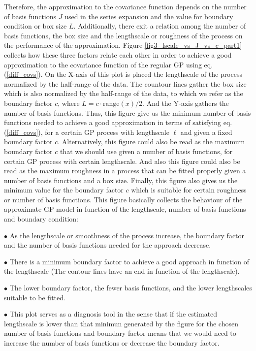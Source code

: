 \documentclass[]{interact}
\theoremstyle{plain}%
\theoremstyle{definition}
\theoremstyle{remark}
\begin{document}
Therefore, the approximation to the covariance function depends on the number of basis functions $J$ used in the series expansion and the value for boundary condition or box size $L$. Additionally, there exit a relation among the number of basis functions, the box size and the lengthscale or roughness of the process on the performance of the approximation. Figure \ref{fig3_lscale_vs_J_vs_c_part1} collects how these three factors relate each other in order to achieve a good approximation to the covariance function of the regular GP using eq. (\ref{diff_covs}). On the X-axis of this plot is placed the lengthscale of the process normalized by the half-range of the data. The countour lines gather the box size which is also normalized by the half-range of the data, to which we refer as the boundary factor $c$, where $L=c \cdot \text{range}(x)/2$. And the Y-axis gathers the number of basis functions. Thus, this figure give us the minimum number of basis functions needed to achieve a good approximation in terms of satisfying eq. (\ref{diff_covs}), for a certain GP process with lengthscale $\ell$ and given a fixed boundary factor $c$. Alternatively, this figure could also be read as the maximum boundary factor $c$ that we should use given a number of basis functions, for certain GP process with certain lengthscale. And also this figure could also be read as the maximum roughness in a process that can be fitted properly given a number of basis functions and a box size. Finally, this figure also gives us the minimum value for the boundary factor $c$ which is suitable for certain roughness or number of basis functions. This figure basically collects the behaviour of the approximate GP model in function of the lengthscale, number of basis functions and boundary condition:

$\bullet$ As the lengthscale or smoothness of the process increase, the boundary factor and the number of basis functions needed for the approach decrease.

$\bullet$ There is a minimum boundary factor to achieve a good approach in function of the lengthscale (The contour lines have an end in function of the lengthscale).

$\bullet$ The lower boundary factor, the fewer basis functions, and the lower lengthscales suitable to be fitted. 

$\bullet$ This plot serves as a diagnosis tool in the sense that if the estimated lengthscale is lower than that minimun generated by the figure for the chosen number of basis functions and boundary factor means that we would need to increase the number of basis functions or decrease the boundary factor.
\end{document}
